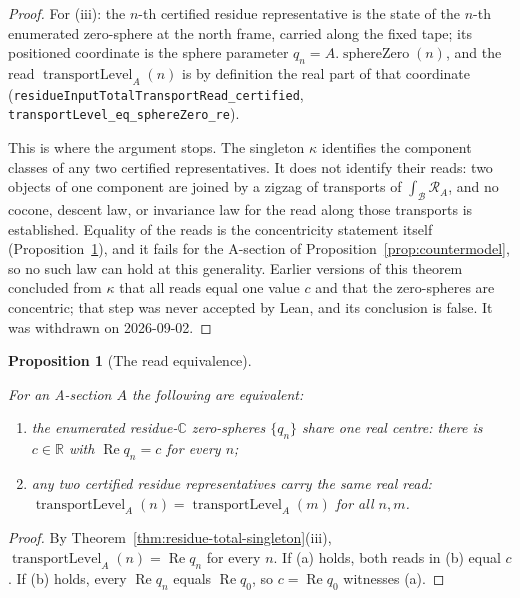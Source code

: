 \documentclass[11pt]{article}
\newcommand{\CC}{\mathbb{C}}
\newcommand{\RR}{\mathbb{R}}
\DeclareMathOperator{\re}{Re}
\providecommand{\lean}[1]{}
\providecommand{\leanok}{}
\providecommand{\uses}[1]{}
\theoremstyle{plain}
\newtheorem{proposition}[theorem]{Proposition}
\theoremstyle{definition}
\theoremstyle{remark}
\begin{document}
\begin{proof}
For (iii): the $n$-th certified residue representative is the state of the $n$-th enumerated
zero-sphere at the north frame, carried along the fixed tape; its positioned coordinate is the
sphere parameter $q_n=A.\operatorname{sphereZero}(n)$, and the read
$\operatorname{transportLevel}_A(n)$ is by definition the real part of that coordinate
\textup{(}\texttt{residueInputTotalTransportRead\_certified},
\texttt{transportLevel\_eq\_sphereZero\_re}\textup{)}.

This is where the argument stops. The singleton $\kappa$ identifies the component classes of any
two certified representatives. It does not identify their reads: two objects of one component
are joined by a zigzag of transports of $\int_{\mathcal B}\mathcal R_A$, and no cocone, descent
law, or invariance law for the read along those transports is established. Equality of the reads
is the concentricity statement itself \textup{(}Proposition~\ref{prop:read-equivalence}\textup{)},
and it fails for the A-section of Proposition~\ref{prop:countermodel}, so no such law can hold
at this generality. Earlier versions of this theorem concluded from $\kappa$ that all reads
equal one value $c$ and that the zero-spheres are concentric; that step was never accepted by
Lean, and its conclusion is false. It was withdrawn on 2026-09-02.
\end{proof}

\begin{proposition}[The read equivalence]\label{prop:read-equivalence}
\lean{ConcentricASection, PairwiseTransportLevel,
concentricASection_iff_pairwiseTransportLevel}
\leanok
\uses{def:A-section, def:residue-subdiagram, thm:residue-total-singleton}
For an A-section $A$ the following are equivalent:
\begin{enumerate}[leftmargin=2.4em]
\item[(a)] the enumerated residue-$\CC$ zero-spheres $\{q_n\}$ share one real centre: there is
  $c\in\RR$ with $\re q_n=c$ for every $n$;
\item[(b)] any two certified residue representatives carry the same real read:
  $\operatorname{transportLevel}_A(n)=\operatorname{transportLevel}_A(m)$ for all $n,m$.
\end{enumerate}
\end{proposition}
\begin{proof}
By Theorem~\ref{thm:residue-total-singleton}(iii), $\operatorname{transportLevel}_A(n)=\re q_n$
for every $n$. If (a) holds, both reads in (b) equal $c$. If (b) holds, every $\re q_n$ equals
$\re q_0$, so $c=\re q_0$ witnesses (a).
\end{proof}
\end{document}
